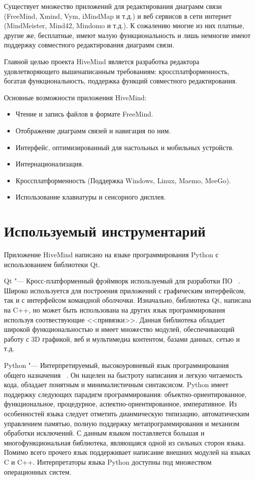 Существует множество приложений для редактирования диаграмм связи (FreeMind,
Xmind, Vym, iMindMap и т.д.) и веб сервисов в сети интернет (MindMeister,
Mind42, Mindomo и т.д.). К сожалению многие из них платные, другие же,
бесплатные, имеют малую функциональность и лишь немногие имеют поддержку
совместного редактирования диаграмм связи.

Главной целью проекта HiveMind является разработка редактора удовлетворяющего
вышенаписанным требованиям: кроссплатформенность, богатая функциональность,
поддержка функций совместного редактирования.

Основные возможности приложения HiveMind:
\begin{itemize}
\item Чтение и запись файлов в формате FreeMind.
\item Отображение диаграмм связей и навигация по ним.
\item Интерфейс, оптимизированный для настольных и мобильных устройств.
\item Интернационализация.
\item Кроссплатформенность (Поддержка Windows, Linux, Maemo, MeeGo).
\item Использование клавиатуры и сенсорного дисплея.
\end{itemize}


\section{Используемый инструментарий}
\label{sec:toolkit}
Приложение HiveMind написано на языке программирования Python с использованием
библиотеки Qt.

Qt "--- Кросс-платформенный фрэймворк используемый для разработки ПО
~\cite{qt4}. Широко используется для построения приложений с графическим
интерфейсом, так и с интерфейсом командной оболчочки. Изначально, библиотека Qt,
написана на C++, но может быть использована на других язык программирования
используя соотвествующие <<привязки>>. Данная библиотека обладает широкой
функциональностью и имеет множество модулей, обеспечивающий работу с 3D
графикой, веб и мультимедиа контентом, базами данных, сетью и т.д.

Python "--- Интерпретируемый, высокоуровневый язык программирования общего
назначения ~\cite{python}. Он нацелен на быстроту написания и легкую читаемость
кода, обладает понятным и минималистичным синтаксисом. Python имеет поддержку
следующих парадигм программирования: объектно-ориентированное, функциональное,
процедурное, аспектно-ориентированное, императивное. Из особенностей языка
следует отметить дианмическую типизацию, автоматическим управлением памятью,
полную поддержку метапрограммирования и механизм обработки исключений. С данным
языком поставляется большая и многофункциональная библиотека, являющаяся одной
из сильных сторон языка. Помимо всего прочего язык поддерживает написание
внешних модулей на языках C и C++. Интерпретаторы языка Python доступны под
множеством операционных систем.

